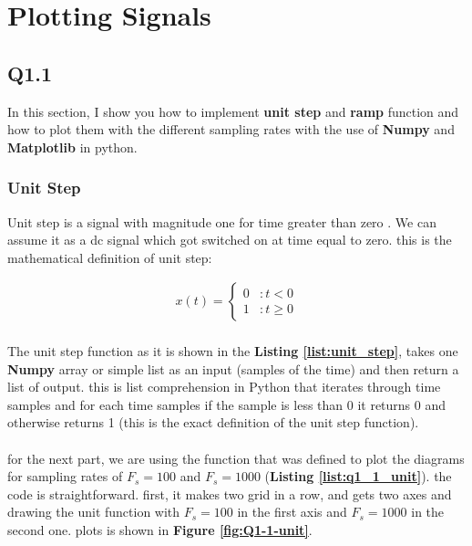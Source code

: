 \section{Plotting Signals}
\subsection{Q1.1}
In this section, I show you how to implement \textbf{unit step}
 and \textbf{ramp} function and how to plot them 
 with the different sampling rates with the use of 
 \textbf{Numpy} and \textbf{Matplotlib} in python.
\subsubsection{Unit Step}

 Unit step is a signal with magnitude one 
for time greater than zero . We can assume it as a dc 
signal which got switched on at time equal to zero.
this is the mathematical definition of unit step:

 \begin{align}
  x(t) = \begin{cases}
   0 &: t<0\\
   1 &: t\geq 0\end{cases}
 \end{align}

 \paragraph{}The unit step function as it is shown in the
  \textbf{Listing \ref{list:unit_step}}, takes one \textbf{Numpy} 
  array or simple list as an input (samples of the time) and then
  return a list of output. this is list comprehension in 
  Python that iterates through time samples and for each 
  time samples if the sample is less than 0 it returns 
  0 and otherwise returns 1 (this is the exact definition 
  of the unit step function). 


\paragraph{}for the next part, we are using the function that was defined to 
plot the diagrams for sampling rates of  $F_s=100$ and 
$F_s=1000$ (\textbf{Listing \ref{list:q1_1_unit}}). the code is 
straightforward. first, it makes two grid in a row, and gets 
two axes and drawing the unit function with $F_s=100$ in the 
first axis and $F_s=1000$ in the second one. plots is shown in \textbf{Figure \ref{fig:Q1-1-unit}}.

